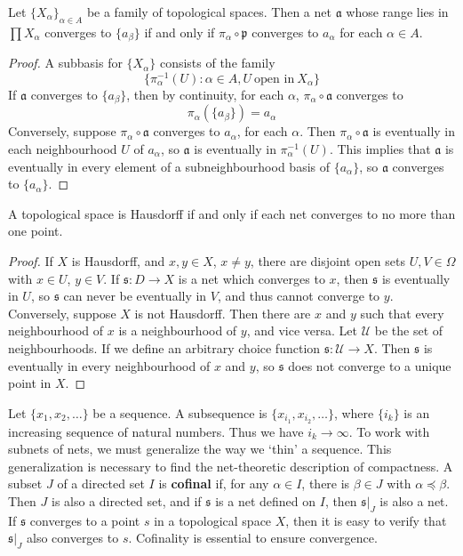 \begin{theorem}
    Let $\{ X_\alpha \}_{\alpha \in A}$ be a family of topological spaces. Then a net $\mathfrak{a}$ whose range lies in $\prod X_\alpha$ converges to $\{ a_\beta \}$ if and only if $\pi_\alpha \circ \mathfrak{p}$ converges to $a_\alpha$ for each $\alpha \in A$.
\end{theorem}
\begin{proof}
    A subbasis for $\{ X_\alpha \}$ consists of the family
    \[ \{ \pi_\alpha^{-1}(U) : \alpha \in A, U \ \text{open in}\ X_\alpha \} \]
    If $\mathfrak{a}$ converges to $\{ a_\beta \}$, then by continuity, for each $\alpha$, $\pi_\alpha \circ \mathfrak{a}$ converges to
    \[ \pi_\alpha( \{ a_\beta \}) = a_\alpha \]
    Conversely, suppose $\pi_\alpha \circ \mathfrak{a}$ converges to $a_\alpha$, for each $\alpha$. Then $\pi_\alpha \circ \mathfrak{a}$ is eventually in each neighbourhood $U$ of $a_\alpha$, so $\mathfrak{a}$ is eventually in $\pi_\alpha^{-1}(U)$. This implies that $\mathfrak{a}$ is eventually in every element of a subneighbourhood basis of $\{ a_\alpha \}$, so $\mathfrak{a}$ converges to $\{ a_\alpha \}$.
\end{proof}

\begin{theorem}
    A topological space is Hausdorff if and only if each net converges to no more than one point.
\end{theorem}
\begin{proof}
    If $X$ is Hausdorff, and $x,y \in X$, $x \neq y$, there are disjoint open sets $U,V \in \Omega$ with $x \in U$, $y \in V$. If $\mathfrak{s}: D \to X$ is a net which converges to $x$, then $\mathfrak{s}$ is eventually in $U$, so $\mathfrak{s}$ can never be eventually in $V$, and thus cannot converge to $y$. Conversely, suppose $X$ is not Hausdorff. Then there are $x$ and $y$ such that every neighbourhood of $x$ is a neighbourhood of $y$, and vice versa. Let $\mathcal{U}$ be the set of neighbourhoods. If we define an arbitrary choice function $\mathfrak{s}: \mathcal{U} \to X$. Then $\mathfrak{s}$ is eventually in every neighbourhood of $x$ and $y$, so $\mathfrak{s}$ does not converge to a unique point in $X$.
\end{proof}

Let $\{ x_1, x_2, \dots \}$ be a sequence. A subsequence is $\{ x_{i_1}, x_{i_2}, \dots \}$, where $\{ i_k \}$ is an increasing sequence of natural numbers. Thus we have $i_k \to \infty$. To work with subnets of nets, we must generalize the way we `thin' a sequence. This generalization is necessary to find the net-theoretic description of compactness. A subset $J$ of a directed set $I$ is {\bf cofinal} if, for any $\alpha \in I$, there is $\beta \in J$ with $\alpha \preceq \beta$. Then $J$ is also a directed set, and if $\mathfrak{s}$ is a net defined on $I$, then $\mathfrak{s}|_J$ is also a net. If $\mathfrak{s}$ converges to a point $s$ in a topological space $X$, then it is easy to verify that $\mathfrak{s}|_J$ also converges to $s$. Cofinality is essential to ensure convergence.

